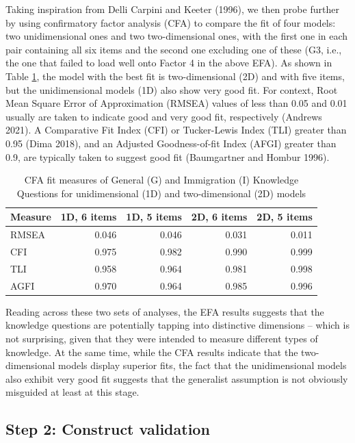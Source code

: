 \documentclass[12pt,halfline,a4paper,]{ouparticle}
\begin{document}
Taking inspiration from Delli Carpini and Keeter (1996), we then probe
further by using confirmatory factor analysis (CFA) to compare the fit
of four models: two unidimensional ones and two two-dimensional ones,
with the first one in each pair containing all six items and the second
one excluding one of these (G3, i.e., the one that failed to load well
onto Factor 4 in the above EFA). As shown in Table \ref{tab:tab3}, the
model with the best fit is two-dimensional (2D) and with five items, but
the unidimensional models (1D) also show very good fit. For context,
Root Mean Square Error of Approximation (RMSEA) values of less than 0.05
and 0.01 usually are taken to indicate good and very good fit,
respectively (Andrews 2021). A Comparative Fit Index (CFI) or
Tucker-Lewis Index (TLI) greater than 0.95 (Dima 2018), and an Adjusted
Goodness-of-fit Index (AFGI) greater than 0.9, are typically taken to
suggest good fit (Baumgartner and Hombur 1996).

\begin{table}

\caption{\label{tab:tab3}CFA fit measures of General (G) and Immigration (I) Knowledge Questions for unidimensional (1D) and two-dimensional (2D) models}
\centering
\begin{tabular}[t]{lrrrr}
\toprule
Measure & 1D, 6 items & 1D, 5 items & 2D, 6 items & 2D, 5 items\\
\midrule
RMSEA & 0.046 & 0.046 & 0.031 & 0.011\\
CFI & 0.975 & 0.982 & 0.990 & 0.999\\
TLI & 0.958 & 0.964 & 0.981 & 0.998\\
AGFI & 0.970 & 0.964 & 0.985 & 0.996\\
\bottomrule
\end{tabular}
\end{table}

Reading across these two sets of analyses, the EFA results suggests that
the knowledge questions are potentially tapping into distinctive
dimensions -- which is not surprising, given that they were intended to
measure different types of knowledge. At the same time, while the CFA
results indicate that the two-dimensional models display superior fits,
the fact that the unidimensional models also exhibit very good fit
suggests that the generalist assumption is not obviously misguided at
least at this stage.

\hypertarget{step-2-construct-validation}{%
\subsection{Step 2: Construct
validation}\label{step-2-construct-validation}}
\end{document}

